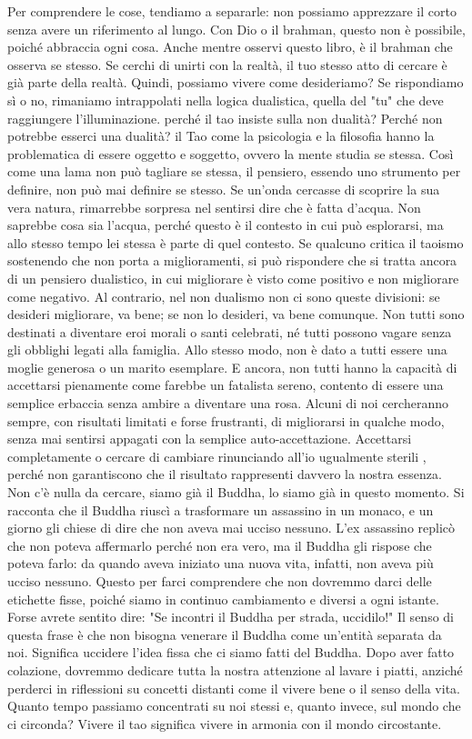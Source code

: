 \documentclass[12pt]{book} %
\begin{document}
Per comprendere le cose, tendiamo a separarle: non possiamo apprezzare il corto senza avere un riferimento al lungo. Con Dio o il brahman, questo non è possibile, poiché abbraccia ogni cosa. Anche mentre osservi questo libro, è il brahman che osserva se stesso.
Se cerchi di unirti con la realtà, il tuo stesso atto di cercare è già parte della realtà. Quindi, possiamo vivere come desideriamo? Se rispondiamo sì o no, rimaniamo intrappolati nella logica dualistica, quella del "tu" che deve raggiungere l'illuminazione.
perché il tao insiste sulla non dualità? Perché non potrebbe esserci una dualità? il Tao come la psicologia e la filosofia hanno la problematica di essere oggetto e soggetto, ovvero la mente studia se stessa. 
Così come una lama non può tagliare se stessa, il pensiero, essendo uno strumento per definire, non può mai definire se stesso.
Se un'onda cercasse di scoprire la sua vera natura, rimarrebbe sorpresa nel sentirsi dire che è fatta d'acqua. Non saprebbe cosa sia l'acqua, perché questo è il contesto in cui può esplorarsi, ma allo stesso tempo lei stessa è parte di quel contesto.
Se qualcuno critica il taoismo sostenendo che non porta a miglioramenti, si può rispondere che si tratta ancora di un pensiero dualistico, in cui migliorare è visto come positivo e non migliorare come negativo. Al contrario, nel non dualismo non ci sono queste divisioni: se desideri migliorare, va bene; se non lo desideri, va bene comunque.
Non tutti sono destinati a diventare eroi morali o santi celebrati, né tutti possono vagare senza gli obblighi legati alla famiglia. Allo stesso modo, non è dato a tutti essere una moglie generosa o un marito esemplare. E ancora, non tutti hanno la capacità di accettarsi pienamente come farebbe un fatalista sereno, contento di essere una semplice erbaccia senza ambire a diventare una rosa. Alcuni di noi cercheranno sempre, con risultati limitati e forse frustranti, di migliorarsi in qualche modo, senza mai sentirsi appagati con la semplice auto-accettazione. Accettarsi completamente o cercare di cambiare rinunciando all'io ugualmente sterili , perché non garantiscono che il risultato rappresenti davvero la nostra essenza.
Non c'è nulla da cercare, siamo già il Buddha, lo siamo già in questo momento.
Si racconta che il Buddha riuscì a trasformare un assassino in un monaco, e un giorno gli chiese di dire che non aveva mai ucciso nessuno. L'ex assassino replicò che non poteva affermarlo perché non era vero, ma il Buddha gli rispose che poteva farlo: da quando aveva iniziato una nuova vita, infatti, non aveva più ucciso nessuno. Questo per farci comprendere che non dovremmo darci delle etichette fisse, poiché siamo in continuo cambiamento e diversi a ogni istante.
Forse avrete sentito dire: "Se incontri il Buddha per strada, uccidilo!" Il senso di questa frase è che non bisogna venerare il Buddha come un’entità separata da noi. Significa uccidere l'idea fissa che ci siamo fatti del Buddha.
Dopo aver fatto colazione, dovremmo dedicare tutta la nostra attenzione al lavare i piatti, anziché perderci in riflessioni su concetti distanti come il vivere bene o il senso della vita. Quanto tempo passiamo concentrati su noi stessi e, quanto invece, sul mondo che ci circonda? Vivere il tao significa vivere in armonia con il mondo circostante.
\end{document}
